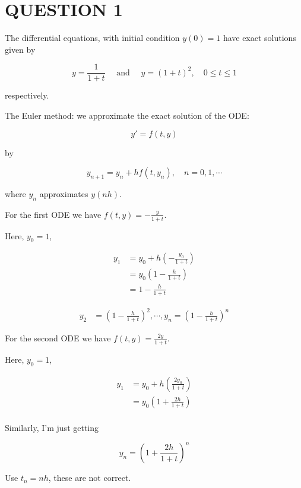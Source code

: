 \documentclass[a4paper]{article}
\begin{document}
	
\maketitle

\section{QUESTION 1}

The differential equations, with initial condition $ y(0)= 1 $ have exact solutions given by

\[ y = \frac{1}{1+t} \quad \text{ and } \quad y = (1 + t)^{2}, \quad 0 \leq t \leq 1\]

respectively.

The Euler method: we approximate the exact solution of the ODE:

\[ y' = f(t,y) \]

by

\[ y_{n+1} = y_{n} + h f(t,y_{n}), \quad n = 0,1,\cdots \] 

where $ y_{n} $ approximates $ y(nh) $.

For the first ODE we have $ f(t,y) = -\frac{y}{1+t} $.

Here, $ y_{0} = 1$,

\begin{align*}
y_{1} & = y_{0} + h \left( - \frac{y_{0}}{1+t} \right) \\
& = y_{0} \left(  1 - \frac{h}{1+t}  \right)  \\
& = 1 - \frac{h}{1+t}
\end{align*}

\begin{align*}
y_{2} & = \left( 1 - \frac{h}{1+t} \right)^{2}, \cdots, y_{n} = \left( 1 - \frac{h}{1+t} \right)^{n}
\end{align*}

For the second ODE we have $ f(t,y) = \frac{2y}{1+t} $.

Here, $ y_{0} = 1$,

\begin{align*}
y_{1} & = y_{0} + h \left( \frac{2 y_{0}}{1+t} \right) \\
& = y_{0} \left(  1 + \frac{2h}{1+t} \right) \\
\end{align*}

Similarly, I'm just getting

\[ y_{n} = \left(   1 + \frac{2h}{1+t} \right)^{n} \]

Use $ t_{n} = nh $, these are not correct. 
\end{document}
